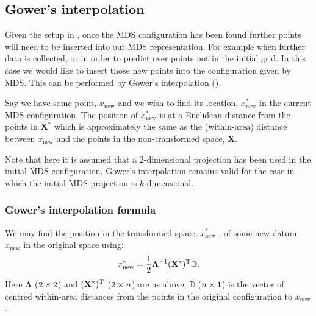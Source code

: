 
\subsection{Gower's interpolation} 
\label{gowers}
Given the setup in , once the MDS configuration has been found further points will need to be inserted into our MDS representation. For example when further data is collected, or in order to predict over points not in the initial grid. In this case we would like to insert those new points into the configuration given by MDS. This can be performed by Gower's interpolation (\cite{gower1968}).

Say we have some point, $x_{\text{new}}$ and we wish to find its location, $x^*_{\text{new}}$ in the current MDS configuration. The position of $x^*_{\text{new}}$ is at a Euclidean distance from the points in $\mathbf{X}^*$ which is approximately the same as the (within-area) distance between $x_{\text{new}}$ and the points in the non-transformed space, $\mathbf{X}$. 

Note that here it is assumed that a 2-dimensional projection has been used in the initial MDS configuration, Gower's interpolation remains valid for the case in which the initial MDS projection is $k$-dimensional.

\subsubsection{Gower's interpolation formula}

We may find the position in the transformed space, $x^*_{\text{new}}$ , of some new datum $x_{\text{new}}$ in the original space using:
\begin{equation}
x^*_{\text{new}} = \frac{1}{2} \mathbf{\Lambda}^{-1} (\mathbf{X}^*)^{\text{T}} \mathbb{D}.
\label{gower}
\end{equation}
Here $\mathbf{\Lambda}$ ($2 \times 2$) and $(\mathbf{X}^*)^{\text{T}}$ ($2 \times n$) are as above, $\mathbb{D}$ ($n \times 1$) is the vector of centred within-area distances from the points in the original configuration to $x_{\text{new}}$.

